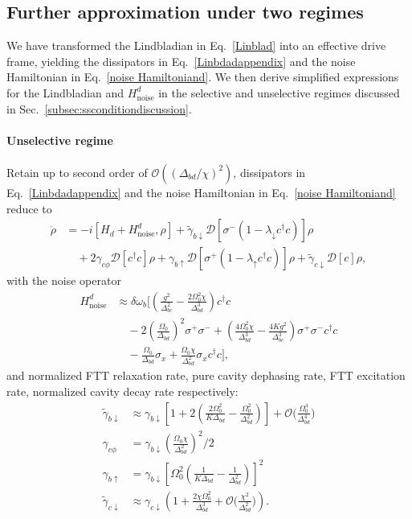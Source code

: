 \subsection{Further approximation under two regimes}
\label{Linbladian regime}
We have transformed the Lindbladian in Eq.~\eqref{Linblad} into an effective drive frame, yielding the dissipators in Eq.~\eqref{Linbdadappendix} and the noise Hamiltonian in Eq.~\eqref{noise Hamiltoniand}. We then derive simplified expressions for the Lindbladian and $H_{\mathrm{noise}}^{d}$ in the selective and unselective regimes discussed in Sec.~\ref{subsec:ssconditiondiscussion}.


\paragraph{Unselective regime}
Retain up to second order of $\mathcal{O}((\Delta_{bd}/\chi)^2)$, dissipators in Eq.~\eqref{Linbdadappendix} and the noise Hamiltonian in Eq.~\eqref{noise Hamiltoniand} reduce to 
\begin{align}
\dot{\rho} &= -i [H_d + H_{\text{noise}}^d, \rho]  + \widetilde{\gamma}_{b\downarrow} \mathcal{D}\left[ \sigma^- (1 - \lambda_\downarrow c^\dagger c) \right] \rho \nonumber \\
&\quad + 2\gamma_{c\phi} \mathcal{D}\left[ c^\dagger c \right] \rho + \gamma_{b\uparrow} \mathcal{D}\left[ \sigma^+ (1 - \lambda_\uparrow c^\dagger c) \right] \rho + \widetilde{\gamma}_{c\downarrow} \mathcal{D}[c] \rho,
\end{align}
with the noise operator 
\begin{align}
H_{\text{noise}}^d &\approx \delta \omega_b \Bigg[ \left( \frac{g^2}{\Delta_{bc}^2} - \frac{2 \Omega_0^2 \chi}{\Delta_{bd}^3} \right) c^\dagger c \nonumber \\
&\quad - 2 \left( \frac{\Omega_0}{\Delta_{bd}} \right)^2 \sigma^+ \sigma^- + \left( \frac{4 \Omega_0^2 \chi}{\Delta_{bd}^3} - \frac{4 K g^2}{\Delta_{bc}^3} \right) \sigma^+ \sigma^- c^\dagger c \nonumber \\
&\quad - \frac{\Omega_0}{\Delta_{bd}} \sigma_x + \frac{\Omega_0 \chi}{\Delta_{bd}^2} \sigma_x c^\dagger c \Bigg],
\end{align}
and normalized FTT relaxation rate, pure cavity dephasing rate, FTT excitation rate, normalized cavity decay rate respectively:
\begin{align}
\widetilde{\gamma}_{b\downarrow} &\approx \gamma_{b\downarrow} \left[ 1 + 2\left( \frac{2\Omega_0^2}{K\Delta_{bd}} - \frac{\Omega_0^2}{\Delta_{bd}^2} \right) \right] +\mathcal{O}\bigg(\frac{\Omega^4_0}{\Delta^4_{bd}}\bigg) \\
\gamma_{c\phi} &= \gamma_{b\downarrow} \left( \frac{\Omega_0 \chi}{\Delta_{bd}^2} \right)^2/2 \\
\gamma_{b\uparrow} &= \gamma_{b\downarrow} \left[ \Omega_0^2 \left( \frac{1}{K\Delta_{bd}} - \frac{1}{\Delta_{bd}^2} \right) \right]^2  \\
\widetilde{\gamma}_{c\downarrow} &\approx \gamma_{c\downarrow} \left( 1 + \frac{2\chi \Omega_0^2}{\Delta_{bd}^3} +\mathcal{O}\bigg(\frac{\chi^2 }{\Delta^2_{bd}}\bigg)\right).
\end{align}
